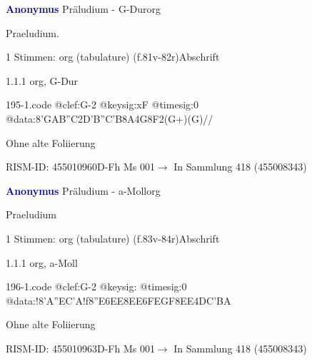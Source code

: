 \documentclass[twocolumn]{book}
\begin{document}
\par \vspace{7pt} \textcolor{darkblue}{\textbf{Anonymus  }}\hfillplus{\textbf{[195]}}\newline Präludium - G-Dur\newline org
\par \begin{itshape}[f.81v, at left:] Praeludium.\end{itshape} 
\par \textcolor{darkblue}{}  1 Stimmen: org (tabulature)  (f.81v-82r)\newline Abschrift
\par 1.1.1  org, G-Dur  
\begin{filecontents*}{195-1.code}
@clef:G-2
@keysig:xF
@timesig:0
@data:{8'GAB''C}2D'B''C'B8A4G8F2(G+)(G)//
\end{filecontents*}
\newline
%
\par Ohne alte Foliierung
\par RISM-ID: 455010960\newline D-Fh  Ms 001\newline $\rightarrow$ In Sammlung 418 (455008343)
      
\par \vspace{7pt} \textcolor{darkblue}{\textbf{Anonymus  }}\hfillplus{\textbf{[196]}}\newline Präludium - a-Moll\newline org
\par \begin{itshape}[f.83v, at left:] Praeludium\end{itshape} 
\par \textcolor{darkblue}{}  1 Stimmen: org (tabulature)  (f.83v-84r)\newline Abschrift
\par 1.1.1  org, a-Moll  
\begin{filecontents*}{196-1.code}
@clef:G-2
@keysig:
@timesig:0
@data:!{8'A''EC'A}!f{8''E6EE}{8EE}{6FEGF}{8EE}4DC'BA
\end{filecontents*}
\newline
%
\par Ohne alte Foliierung
\par RISM-ID: 455010963\newline D-Fh  Ms 001\newline $\rightarrow$ In Sammlung 418 (455008343)
      
\end{document}
